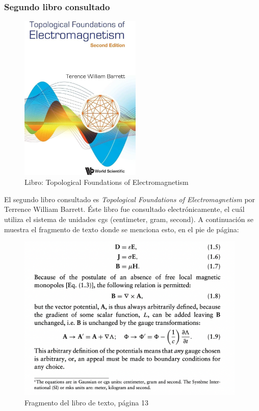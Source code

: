 \documentclass[12pt, letterpaper]{report}
\begin{document}
\subsubsection*{Segundo libro consultado}
\begin{figure}[H]
    \centering
    \includegraphics[height = 8cm]{2024-04-03_LibroConsultado_2.jpg}
    \caption{Libro: Topological Foundations of Electromagnetism}
\end{figure}
El segundo libro consultado es \textit{Topological Foundations of Electromagnetism} por 
Terrence William Barrett. Éste libro fue consultado electrónicamente, el cuál 
utiliza el sistema de unidades cgs (centimeter, gram, second). A continuación se muestra el fragmento de 
texto donde se menciona esto, en el pie de página: \\ 

\begin{figure}[H]
    \centering
    \includegraphics[height = 8cm]{2024-03-03_LibroElectromagnetismo_2_Fragmento.png}
    \caption{Fragmento del libro de texto, página 13}
\end{figure}
\end{document}

